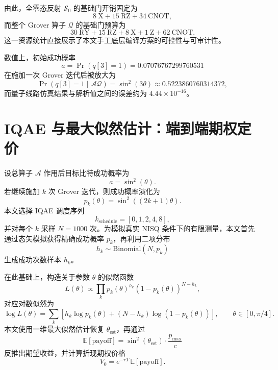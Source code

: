 \documentclass[12pt,a4paper]{ctexart}
\begin{document}
由此，全零态反射 $\mathcal{S}_0$ 的基础门开销固定为
\begin{equation}
8\ \mathrm{X} + 15\ \mathrm{RZ} + 34\ \mathrm{CNOT},
\end{equation}
而整个 Grover 算子 $\mathcal{Q}$ 的基础门预算为
\begin{equation}
30\ \mathrm{RY} + 15\ \mathrm{RZ} + 8\ \mathrm{X} + 1\ \mathrm{Z} + 62\ \mathrm{CNOT}.
\end{equation}
这一资源统计直接展示了本文手工底层编译方案的可控性与可审计性。

数值上，初始成功概率
\begin{equation}
a=\Pr(q[3]=1)=0.07076767299760531
\end{equation}
在施加一次 Grover 迭代后被放大为
\begin{equation}
\Pr(q[3]=1\mid \mathcal{A}\mathcal{Q})=\sin^2(3\theta)\approx 0.5223860760314372,
\end{equation}
而量子线路仿真结果与解析值之间的误差约为 $4.44\times 10^{-16}$。

\section{IQAE 与最大似然估计：端到端期权定价}
设总算子 $\mathcal{A}$ 作用后目标比特成功概率为
\begin{equation}
a=\sin^2(\theta).
\end{equation}
若继续施加 $k$ 次 Grover 迭代，则成功概率演化为
\begin{equation}
p_k(\theta)=\sin^2((2k+1)\theta).
\end{equation}
本文选择 IQAE 调度序列
\begin{equation}
k_{\mathrm{schedule}}=[0,1,2,4,8],
\end{equation}
并对每个 $k$ 采样 $N=1000$ 次。为模拟真实 NISQ 条件下的有限测量，本文首先通过态矢模拟获得精确成功概率 $p_k$，再利用二项分布
\begin{equation}
h_k \sim \mathrm{Binomial}(N,p_k)
\end{equation}
生成成功次数样本 $h_k$。

在此基础上，构造关于参数 $\theta$ 的似然函数
\begin{equation}
L(\theta)\propto \prod_k p_k(\theta)^{h_k}\left(1-p_k(\theta)\right)^{N-h_k},
\end{equation}
对应对数似然为
\begin{equation}
\log L(\theta)=
\sum_k\left[
h_k\log p_k(\theta)+(N-h_k)\log(1-p_k(\theta))
\right],
\qquad \theta\in[0,\pi/4].
\end{equation}
本文使用一维最大似然估计恢复 $\theta_{\mathrm{est}}$，再通过
\begin{equation}
\mathbb{E}[\mathrm{payoff}]
=
\sin^2(\theta_{\mathrm{est}})\cdot \frac{p_{\max}}{c}
\end{equation}
反推出期望收益，并计算折现期权价格
\begin{equation}
V_0=e^{-rT}\,\mathbb{E}[\mathrm{payoff}].
\end{equation}
\end{document}
